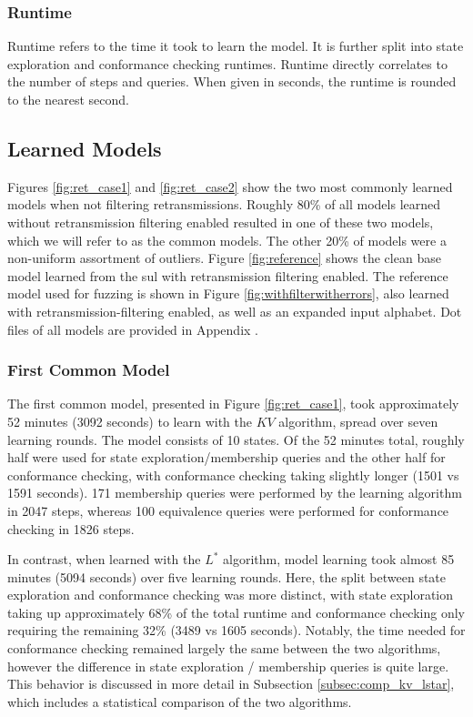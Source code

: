 \subsubsection*{Runtime}
Runtime refers to the time it took to learn the model. It is further split into state exploration and conformance checking runtimes. Runtime directly correlates to the number of steps and queries. When given in seconds, the runtime is rounded to the nearest second.


\subsection{Learned Models} \label{subsec:models}
Figures \ref{fig:ret_case1} and \ref{fig:ret_case2} show the two most commonly learned models when not filtering retransmissions. Roughly 80\% of all models learned without retransmission filtering enabled resulted in one of these two models, which we will refer to as the common models. The other 20\% of models were a non-uniform assortment of outliers. Figure \ref{fig:reference} shows the clean base model learned from the \ac{sul} with retransmission filtering enabled. The reference model used for fuzzing is shown in Figure \ref{fig:withfilterwitherrors}, also learned with retransmission-filtering enabled, as well as an expanded input alphabet. Dot files of all models are provided in Appendix .

\subsubsection*{First Common Model}

The first common model, presented in Figure \ref{fig:ret_case1}, took approximately 52 minutes (3092 seconds) to learn with the $KV$ algorithm, spread over seven learning rounds. The model consists of 10 states. Of the 52 minutes total, roughly half were used for state exploration/membership queries and the other half for conformance checking, with conformance checking taking slightly longer (1501 vs 1591 seconds). 171 membership queries were performed by the learning algorithm in 2047 steps, whereas 100 equivalence queries were performed for conformance checking in 1826 steps.

In contrast, when learned with the $L^*$ algorithm, model learning took almost 85 minutes (5094 seconds) over five learning rounds. Here, the split between state exploration and conformance checking was more distinct, with state exploration taking up approximately 68\% of the total runtime and conformance checking only requiring the remaining 32\% (3489 vs 1605 seconds). Notably, the time needed for conformance checking remained largely the same between the two algorithms, however the difference in state exploration / membership queries is quite large. This behavior is discussed in more detail in Subsection \ref{subsec:comp_kv_lstar}, which includes a statistical comparison of the two algorithms.

